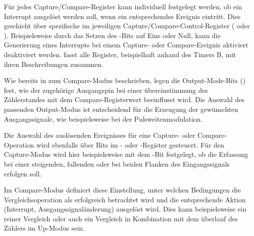 F\"ur jedes Capture/Compare-Register kann individuell festgelegt werden, ob ein Interrupt ausgel\"ost werden soll, wenn ein entsprechendes Ereignis eintritt. Dies geschieht \"uber spezifische  im jeweiligen Capture/Compare-Control-Register ( oder ). Beispielsweise durch das Setzen des -Bits auf Eins oder Null, kann die Generierung eines Interrupts bei einem Capture- oder Compare-Ereignis aktiviert \bzw deaktiviert werden.  fasst alle Register, beispielhaft anhand des Timers B, mit ihren Beschreibungen zusammen.

Wie bereits in  zum Compare-Modus beschrieben, legen die Output-Mode-Bits () fest, wie der zugeh\"orige Ausgangspin bei einer \"ubereinstimmung des Z\"ahlerstandes mit dem Compare-Registerwert beeinflusst wird. Die Auswahl des passenden Output-Modus ist entscheidend f\"ur die Erzeugung der gew\"unschten Ausgangssignale, wie beispielsweise bei der Pulsweitenmodulation.

Die Auswahl des ausl\"osenden Ereignisses f\"ur eine Capture- oder Compare-Operation wird ebenfalls \"uber Bits im - oder -Register gesteuert. F\"ur den Capture-Modus wird hier beispielsweise mit dem -Bit festgelegt, ob die Erfassung bei einer steigenden, fallenden oder bei beiden Flanken des Eingangssignals erfolgen soll. 

\newpage
Im Compare-Modus definiert diese Einstellung, unter welchen Bedingungen die Vergleichsoperation als erfolgreich betrachtet wird und die entsprechende Aktion (Interrupt, Ausgangssignal\"anderung) ausgel\"ost wird. Dies kann beispielsweise ein reiner Vergleich oder auch ein Vergleich in Kombination mit dem \"uberlauf des Z\"ahlers im Up-Modus sein. 

